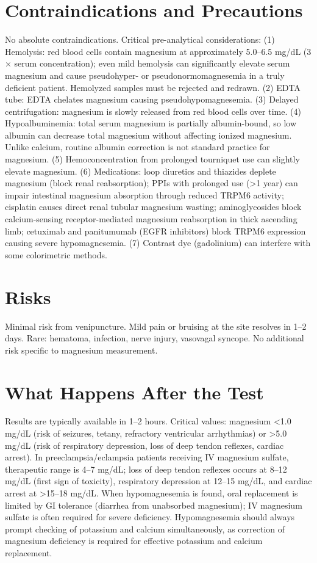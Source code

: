 \section*{Contraindications and Precautions}
No absolute contraindications. Critical pre-analytical considerations: (1) Hemolysis: red blood cells contain magnesium at approximately 5.0--6.5 mg/dL (3$\times$ serum concentration); even mild hemolysis can significantly elevate serum magnesium and cause pseudohyper- or pseudonormomagnesemia in a truly deficient patient. Hemolyzed samples must be rejected and redrawn. (2) EDTA tube: EDTA chelates magnesium causing pseudohypomagnesemia. (3) Delayed centrifugation: magnesium is slowly released from red blood cells over time. (4) Hypoalbuminemia: total serum magnesium is partially albumin-bound, so low albumin can decrease total magnesium without affecting ionized magnesium. Unlike calcium, routine albumin correction is not standard practice for magnesium. (5) Hemoconcentration from prolonged tourniquet use can slightly elevate magnesium. (6) Medications: loop diuretics and thiazides deplete magnesium (block renal reabsorption); PPIs with prolonged use (>1 year) can impair intestinal magnesium absorption through reduced TRPM6 activity; cisplatin causes direct renal tubular magnesium wasting; aminoglycosides block calcium-sensing receptor-mediated magnesium reabsorption in thick ascending limb; cetuximab and panitumumab (EGFR inhibitors) block TRPM6 expression causing severe hypomagnesemia. (7) Contrast dye (gadolinium) can interfere with some colorimetric methods.

\section*{Risks}
Minimal risk from venipuncture. Mild pain or bruising at the site resolves in 1--2 days. Rare: hematoma, infection, nerve injury, vasovagal syncope. No additional risk specific to magnesium measurement.

\section*{What Happens After the Test}
Results are typically available in 1--2 hours. Critical values: magnesium <1.0 mg/dL (risk of seizures, tetany, refractory ventricular arrhythmias) or >5.0 mg/dL (risk of respiratory depression, loss of deep tendon reflexes, cardiac arrest). In preeclampsia/eclampsia patients receiving IV magnesium sulfate, therapeutic range is 4--7 mg/dL; loss of deep tendon reflexes occurs at 8--12 mg/dL (first sign of toxicity), respiratory depression at 12--15 mg/dL, and cardiac arrest at >15--18 mg/dL. When hypomagnesemia is found, oral replacement is limited by GI tolerance (diarrhea from unabsorbed magnesium); IV magnesium sulfate is often required for severe deficiency. Hypomagnesemia should always prompt checking of potassium and calcium simultaneously, as correction of magnesium deficiency is required for effective potassium and calcium replacement.

